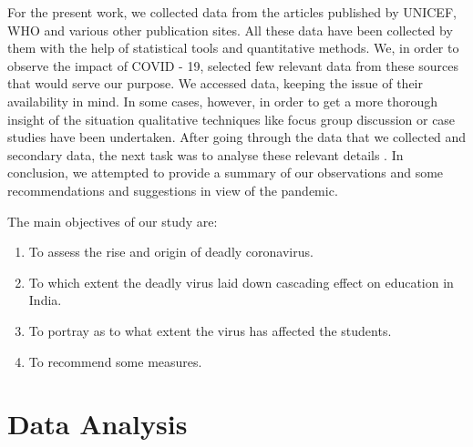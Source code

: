 \documentclass[11pt]{scrartcl}
\begin{document}
	For the present work, we collected data from the articles published by UNICEF, WHO and various other publication sites. All these data have been collected by them with the help of statistical tools and quantitative methods. We, in order to observe the impact of COVID - 19, selected few relevant data from these sources that would serve our purpose. We accessed data, keeping the issue of their availability in mind. In some cases, however, in order to get a more thorough insight of the situation qualitative techniques like focus group discussion or case studies have been undertaken. After going through the data that we collected and secondary data, the next task was to analyse these relevant details . In conclusion, we attempted to provide a summary of our observations and some recommendations and suggestions in view of the pandemic. 
	
	The main objectives of our study are: 
	
	\begin{enumerate}
		\item To assess the rise and origin of deadly coronavirus.
		
		\item To which extent the deadly virus laid down cascading effect on education in India.
		
		\item To portray as to what extent the virus has affected the students.
		
		\item To recommend some measures.
	\end{enumerate}

	\pagebreak

	\section{Data Analysis}
	
\end{document}
